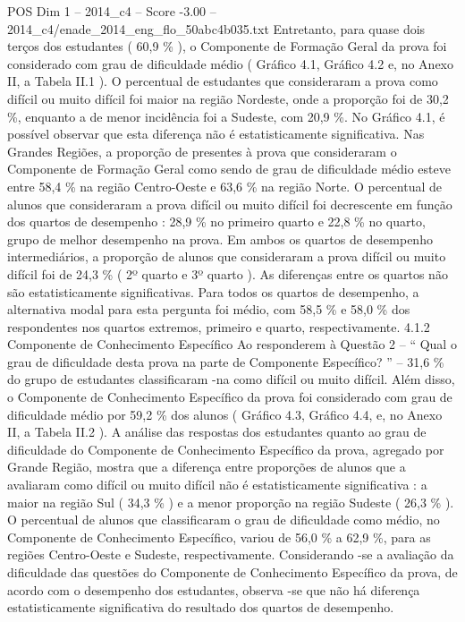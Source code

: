 \begin{textsample}{POS Dim 1 – 2014\_c4 – Score -3.00 – 2014\_c4/enade\_2014\_eng\_flo\_50abc4b035.txt}
Entretanto, para quase dois terços dos estudantes ( 60,9 \% ), o Componente de Formação Geral da prova foi considerado com grau de dificuldade médio ( Gráfico 4.1, Gráfico 4.2 e, no Anexo II, a Tabela II.1 ).
O percentual de estudantes que consideraram a prova como difícil ou muito difícil foi maior na região Nordeste, onde a proporção foi de 30,2 \%, enquanto a de menor incidência foi a Sudeste, com 20,9 \%.
No Gráfico 4.1, é possível observar que esta diferença não é estatisticamente significativa.
Nas Grandes Regiões, a proporção de presentes à prova que consideraram o Componente de Formação Geral como sendo de grau de dificuldade médio esteve entre 58,4 \% na região Centro-Oeste e 63,6 \% na região Norte.
O percentual de alunos que consideraram a prova difícil ou muito difícil foi decrescente em função dos quartos de desempenho : 28,9 \% no primeiro quarto e 22,8 \% no quarto, grupo de melhor desempenho na prova.
Em ambos os quartos de desempenho intermediários, a proporção de alunos que consideraram a prova difícil ou muito difícil foi de 24,3 \% ( 2º quarto e 3º quarto ).
As diferenças entre os quartos não são estatisticamente significativas.
Para todos os quartos de desempenho, a alternativa modal para esta pergunta foi médio, com 58,5 \% e 58,0 \% dos respondentes nos quartos extremos, primeiro e quarto, respectivamente. 4.1.2 Componente de Conhecimento Específico Ao responderem à Questão 2 – “ Qual o grau de dificuldade desta prova na parte de Componente Específico? ” – 31,6 \% do grupo de estudantes classificaram -na como difícil ou muito difícil.
Além disso, o Componente de Conhecimento Específico da prova foi considerado com grau de dificuldade médio por 59,2 \% dos alunos ( Gráfico 4.3, Gráfico 4.4, e, no Anexo II, a Tabela II.2 ).
A análise das respostas dos estudantes quanto ao grau de dificuldade do Componente de Conhecimento Específico da prova, agregado por Grande Região, mostra que a diferença entre proporções de alunos que a avaliaram como difícil ou muito difícil não é estatisticamente significativa : a maior na região Sul ( 34,3 \% ) e a menor proporção na região Sudeste ( 26,3 \% ).
O percentual de alunos que classificaram o grau de dificuldade como médio, no Componente de Conhecimento Específico, variou de 56,0 \% a 62,9 \%, para as regiões Centro-Oeste e Sudeste, respectivamente.
Considerando -se a avaliação da dificuldade das questões do Componente de Conhecimento Específico da prova, de acordo com o desempenho dos estudantes, observa -se que não há diferença estatisticamente significativa do resultado dos quartos de desempenho.

\end{textsample}
